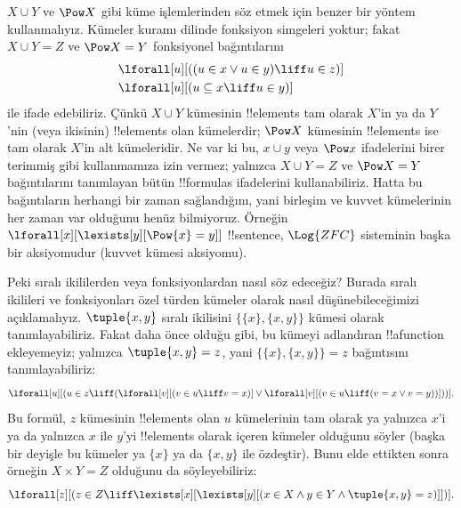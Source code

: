 \documentclass[../../../include/open-logic-section]{subfiles}
\begin{document}
$X\cup Y$ ve $\Pow X$ gibi küme işlemlerinden söz etmek için benzer bir
yöntem kullanmalıyız. Kümeler kuramı dilinde fonksiyon simgeleri yoktur;
fakat $X\cup Y=Z$ ve $\Pow X=Y$ fonksiyonel bağıntılarını
\begin{align*}
& \lforall[u][((u \in x \lor u \in y) \liff u \in z)]\\
& \lforall[u][(u \subseteq x \liff u \in y)]
\end{align*}
ile ifade edebiliriz. Çünkü $X\cup Y$ kümesinin !!{element}s tam olarak
$X$'in ya da $Y$'nin (veya ikisinin) !!{element}s olan kümelerdir;
$\Pow X$ kümesinin !!{element}s ise tam olarak $X$'in alt kümeleridir.
Ne var ki bu, $x\cup y$ veya $\Pow x$ ifadelerini birer terimmiş gibi
kullanmamıza izin vermez; yalnızca $X\cup Y=Z$ ve $\Pow X=Y$
bağıntılarını tanımlayan bütün !!{formula}s ifadelerini kullanabiliriz.
Hatta bu bağıntıların herhangi bir zaman sağlandığını, yani birleşim ve
kuvvet kümelerinin her zaman var olduğunu henüz bilmiyoruz. Örneğin
$\lforall[x][\lexists[y][\Pow{x}=y]]$ !!{sentence}, $\Log{ZFC}$
sisteminin başka bir aksiyomudur (kuvvet kümesi aksiyomu).

Peki sıralı ikililerden veya fonksiyonlardan nasıl söz edeceğiz? Burada
sıralı ikilileri ve fonksiyonları özel türden kümeler olarak nasıl
düşünebileceğimizi açıklamalıyız. $\tuple{x,y}$ sıralı ikilisini
$\{\{x\},\{x,y\}\}$ kümesi olarak tanımlayabiliriz. Fakat daha önce
olduğu gibi, bu kümeyi adlandıran !!a{function} ekleyemeyiz; yalnızca
$\tuple{x,y}=z$, yani $\{\{x\},\{x,y\}\}=z$ bağıntısını tanımlayabiliriz:
\[
\lforall[u][(u \in z \liff (\lforall[v][(v \in u \liff v = x)] \lor
  \lforall[v][(v \in u \liff (v = x \lor v = y))]))].
\]
Bu formül, $z$ kümesinin !!{element}s olan $u$ kümelerinin tam olarak
ya yalnızca $x$'i ya da yalnızca $x$ ile $y$'yi !!{element}s olarak
içeren kümeler olduğunu söyler (başka bir deyişle bu kümeler ya
$\{x\}$ ya da $\{x,y\}$ ile özdeştir). Bunu elde ettikten sonra örneğin
$X\times Y=Z$ olduğunu da söyleyebiliriz:
\[
\lforall[z][(z \in Z \liff \lexists[x][\lexists[y][(x \in
        X \land y \in Y \land \tuple{x, y} = z)]])].
\]
\end{document}
